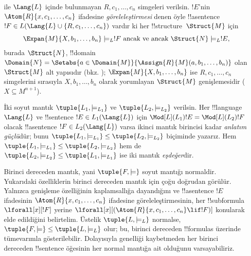 \begin{defn}
\begin{enumerate}
  ile $\Lang{L}$ içinde bulunmayan $R,c_1,\dots,c_n$ simgeleri verilsin.
  $!E$'nin $\Atom{R}{x,c_1,\dots,c_n}$ ifadesine
  \emph{göreleleştirmesi} denen öyle !!a{sentence}
  $!F\in L(\Lang{L}\cup\{R,c_1,\ldots,c_n\})$ vardır ki her
  !!{structure}~$\Struct{M}$ için
  \[
  \Expan{M}{X,b_1,\ldots,b_n}\models_L !F \text{ ancak ve ancak }
  \Struct{N}\models_L !E,
  \]
  burada $\Struct{N}$, !!{domain}
  $\Domain{N}=\Setabs{a\in\Domain{M}}{\Assign{R}{M}(a,b_1,\dots,b_n)}$
  olan $\Struct{M}$ alt yapısıdır (bkz. );
  $\Expan{M}{X,b_1,\ldots,b_n}$ ise $R,c_1,\dots,c_n$ simgelerini sırasıyla
  $X,b_1,\dots,b_n$ olarak yorumlayan $\Struct{M}$ genişlemesidir
  ($X\subseteq M^{n+1}$).
\end{enumerate}
\end{defn}

\begin{defn}
İki soyut mantık $\tuple{L_1,\models_{L_1}}$ ve
$\tuple{L_2,\models_{L_2}}$ verilsin. Her !!{language} $\Lang{L}$ ve
!!{sentence} $!E\in L_1(\Lang{L})$ için
$\Mod[L](L_1){!E}=\Mod[L](L_2){!F}$ olacak !!a{sentence}
$!F\in L_2(\Lang{L})$ varsa ikinci mantık birincisi kadar
\emph{anlatım güçlü}dür; bunu
$\tuple{L_1,\models_{L_1}}\leq\tuple{L_2,\models_{L_2}}$ biçiminde yazarız.
Hem $\tuple{L_1,\models_{L_1}}\leq\tuple{L_2,\models_{L_2}}$ hem de
$\tuple{L_2,\models_{L_2}}\leq\tuple{L_1,\models_{L_1}}$ ise iki mantık
\emph{eşdeğer}dir.
\end{defn}

\begin{rem}
  Birinci dereceden mantık, yani $\tuple{F,\models}$ soyut mantığı normaldir.
  Yukarıdaki özelliklerin birinci dereceden mantık için çoğu doğrudan
  görülür. Yalnızca genişleme özelliğinin kaplamsallığa dayandığını ve
  !!a{sentence} $!E$ ifadesinin $\Atom{R}{x,c_1,\dots,c_n}$ ifadesine
  göreleleştirmesinin, her !!{subformula}
  $\lforall[x][!F]$ yerine
  $\lforall[x][(\Atom{R}{x,c_1,\dots,c_n}\lif !F)]$ konularak elde
  edildiğini belirtelim. Üstelik $\tuple{L,\models_L}$ normalse,
  $\tuple{F,\models}\leq\tuple{L,\models_L}$ olur; bu, birinci dereceden
  !!{formula}s üzerinde tümevarımla gösterilebilir. Dolayısıyla genelliği
  kaybetmeden her birinci dereceden !!{sentence} öğesinin her normal mantığa
  ait olduğunu varsayabiliriz.
\end{rem}

